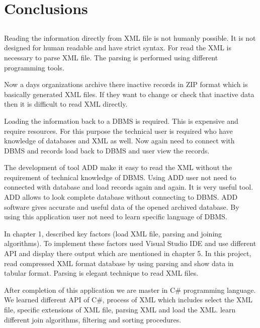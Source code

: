 \chapter{Conclusions}\label{chap:conclusions}

\section*{}
Reading the information directly from XML file is not humanly possible. It is not designed for human readable and have strict syntax. For read the XML is necessary to parse XML file. The parsing is performed using different programming tools. 
\par Now a days organizations archive there inactive records in ZIP format which is basically generated XML files. If they want to change or check that inactive data then it is difficult to read XML directly. 

\par Loading the information back to a DBMS is required. This is expensive and require resources. For this purpose the technical user is required who have knowledge of databases and XML as well. Now again need to connect with DBMS and records load back to DBMS and user view the records. 

\par The development of tool ADD make it easy to read the XML without the requirement of technical knowledge of DBMS. Using ADD user not need to connected with database and load records again and again. It is very useful tool. ADD allows to look complete database without connecting to DBMS. ADD software gives accurate and useful data of the opened archived database. By using this application user not need to learn specific language of DBMS.

In chapter 1, described key factors (load XML file, parsing and joining algorithms). To implement these factors used Visual Studio IDE and use different API and display there output which are mentioned in chapter 5.
In this project, read compressed XML format database by using parsing and show data in tabular format. Parsing is elegant technique to read XML files. 

\par After completion of this application we are master in C\# programming language. We learned different API of C\#, process of XML which includes select the XML file, specific extensions of XML file, parsing XML and load the XML. learn different join algorithms, filtering and sorting procedures.
  


